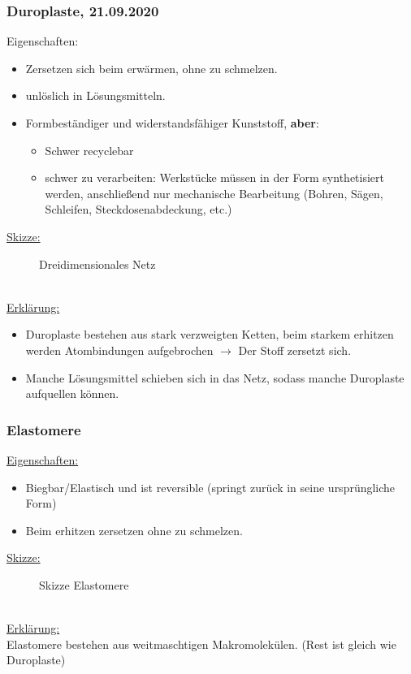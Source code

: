 \documentclass[../../main.tex]{subfiles}
\begin{document}
\subsubsection{Duroplaste, 21.09.2020}
Eigenschaften:
\begin{itemize}
    \item Zersetzen sich beim erwärmen, ohne zu schmelzen.
    \item unlöslich in Lösungsmitteln.
    \item Formbeständiger und widerstandsfähiger Kunststoff, \textbf{aber}:
        \begin{itemize}
            \item Schwer recyclebar
            \item schwer zu verarbeiten: Werkstücke müssen in der Form
                synthetisiert werden, anschließend nur mechanische Bearbeitung
                (Bohren, Sägen, Schleifen, Steckdosenabdeckung, etc.)
        \end{itemize}
\end{itemize}
\underline{Skizze:}
\begin{figure}[ht]
    \centering
    \caption{Dreidimensionales Netz}
    \label{fig:skizze_duroplaste}
\end{figure}
%
\\
\underline{Erklärung:}
\begin{itemize}
    \item Duroplaste bestehen aus stark verzweigten Ketten, beim starkem
        erhitzen werden Atombindungen aufgebrochen $\rightarrow$ Der Stoff
        zersetzt sich. 
    \item  Manche Lösungsmittel schieben sich in das Netz, sodass manche
        Duroplaste aufquellen können.
\end{itemize}
\subsubsection{Elastomere}
\underline{Eigenschaften:}
\begin{itemize}
    \item Biegbar/Elastisch und ist reversible (springt zurück in seine ursprüngliche Form)
    \item Beim erhitzen zersetzen ohne zu schmelzen.
\end{itemize}
\newpage
\underline{Skizze:}
\begin{figure}[ht]
    \centering
    \caption{Skizze Elastomere}
    \label{fig:skizze_elastomere}
\end{figure}
%
\\
\underline{Erklärung:}
\\
Elastomere bestehen aus weitmaschtigen Makromolekülen. (Rest ist gleich wie Duroplaste)
\newpage
\end{document}
